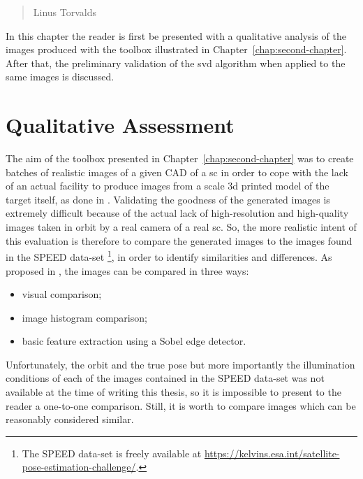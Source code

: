 \begin{quotation}
  {\footnotesize
    \begin{flushright}
      Linus Torvalds
    \end{flushright}
  }
\end{quotation}
\vspace{0.5cm}

In this chapter the reader is first be presented with a qualitative analysis of the images produced with the toolbox illustrated in Chapter~\ref{chap:second-chapter}. After that, the preliminary validation of the \acrshort{svd} algorithm when applied to the same images is discussed.

\section{Qualitative Assessment}
The aim of the toolbox presented in Chapter~\ref{chap:second-chapter} was to create batches of realistic images of a given CAD of a \acrshort{sc} in order to cope with the lack of an actual facility to produce images from a scale \acrshort{3d} printed model of the target itself, as done in \cite{Beierle2019}. Validating the goodness of the generated images is extremely difficult because of the actual lack of high-resolution and high-quality images taken in orbit by a real camera of a real \acrshort{sc}. So, the more realistic intent of this evaluation is therefore to compare the generated images to the images found in the SPEED data-set \footnote{The SPEED data-set is freely available at \url{https://kelvins.esa.int/satellite-pose-estimation-challenge/}.}, in order to identify similarities and differences. As proposed in \cite{pangufinal}, the images can be compared in three ways:

\begin{itemize}
  \item visual comparison;
  \item image histogram comparison;
  \item basic feature extraction using a Sobel edge detector.
\end{itemize}

Unfortunately, the orbit and the true pose but more importantly the illumination conditions of each of the images contained in the SPEED data-set was not available at the time of writing this thesis, so it is impossible to present to the reader a one-to-one comparison. Still, it is worth to compare images which can be reasonably considered similar.

